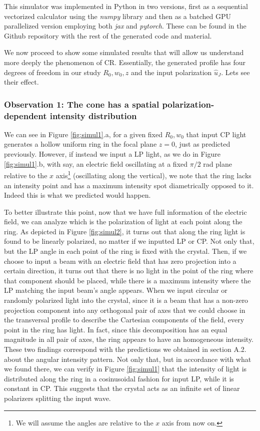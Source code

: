 \documentclass[11pt, a4paper, twoside]{article} %
\begin{document}
This simulator was implemented in Python in two versions, first as a sequential vectorized calculator using the {\em numpy} library and then as a batched GPU parallelized version employing both {\em jax} and {\em pytorch}. These can be found in the Github repository \cite{git} with the rest of the generated code and material. 

We now proceed to show some simulated results that will allow us understand more deeply the phenomenon of CR. Essentially, the generated profile has four degrees of freedom in our study $R_0,w_0,z$ and the input polarization $\hat{u}_J$. Lets see their effect.



\subsubsection*{Observation 1: The cone has a spatial polarization-dependent intensity distribution}
We can see in Figure \ref{fig:simul1}.a, for a given fixed $R_0,w_0$ that input CP light generates a hollow uniform ring in the focal plane $z=0$, just as predicted previously. However, if instead we input a LP light, as we do in Figure \ref{fig:simul1}.b, with say, an electric field oscillating at a fixed $\pi/2$ rad plane relative to the $x$ axis\footnote{We will assume the angles are relative to the $x$ axis from now on.} (oscillating along the vertical), we note that the ring lacks an intensity point and has a maximum intensity spot diametrically opposed to it. Indeed this is what we predicted would happen. 

To better illustrate this point, now that we have full information of the electric field, we can analyze which is the polarization of light at each point along the ring. As depicted in Figure \ref{fig:simul2}, it turns out that along the ring light is found to be linearly polarized, no matter if we inputted LP or CP. Not only that, but the LP angle in each point of the ring is fixed with the crystal. Then, if we choose to input a beam with an electric field that has zero projection into a certain direction, it turns out that there is no light in the point of the ring where that component should be placed, while there is a maximum intensity where the LP matching the input beam's angle appears. When we input circular or randomly polarized light into the crystal, since it is a beam that has a non-zero projection component into any orthogonal pair of axes that we could choose in the transversal profile to describe the Cartesian components of the field, every point in the ring has light. In fact, since this decomposition has an equal magnitude in all pair of axes, the ring appears to have an homogeneous intensity. These two findings correspond with the predictions we obtained in section A.2. about the angular intensity pattern. Not only that, but in accordance with what we found there, we can verify in Figure \ref{fig:simul1} that the intensity of light is distributed along the ring in a cosinusoidal fashion for input LP, while it is constant in CP. This suggests that the crystal acts as an infinite set of linear polarizers splitting the input wave.
\end{document}
